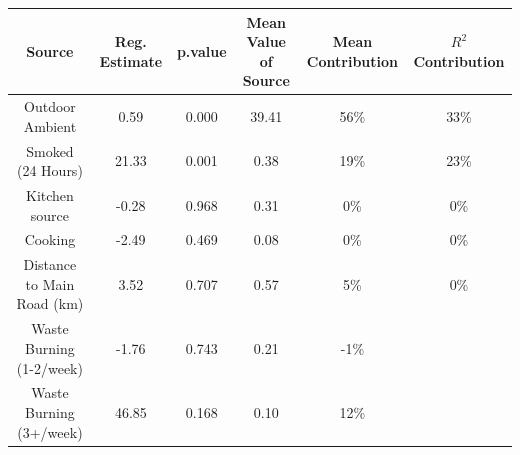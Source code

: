 
\begin{tabular}{cccccc}
\toprule
Source & Reg. Estimate & p.value & Mean Value of Source & Mean Contribution & $R^2$ Contribution\\
\midrule
Outdoor Ambient & 0.59 & 0.000 & 39.41 & 56\% & 33\%\\
Smoked (24 Hours) & 21.33 & 0.001 & 0.38 & 19\% & 23\%\\
Kitchen source & -0.28 & 0.968 & 0.31 & 0\% & 0\%\\
Cooking & -2.49 & 0.469 & 0.08 & 0\% & 0\%\\
Distance to Main Road (km) & 3.52 & 0.707 & 0.57 & 5\% & 0\%\\
\addlinespace
Waste Burning (1-2/week) & -1.76 & 0.743 & 0.21 & -1\% & \\
Waste Burning (3+/week) & 46.85 & 0.168 & 0.10 & 12\% & \\
\bottomrule
\end{tabular}
